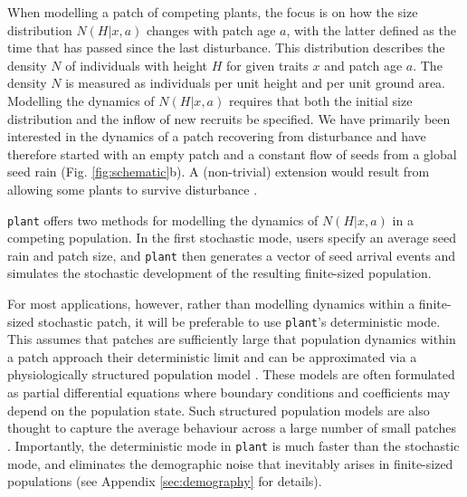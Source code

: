 \documentclass[a4paper,11pt]{article}
\newcommand{\plant}{\texttt{plant}}
\begin{document}
When modelling a patch of competing plants, the focus is on how the size distribution \(N(H | x, a)\) changes with patch age \(a\), with the latter defined as the time that has passed since the last disturbance. This distribution describes the density \(N\) of
individuals with height \(H\) for given traits \(x\) and patch age \(a\).
The density \(N\) is measured as individuals per unit height and per unit ground area.
Modelling the dynamics of \(N(H | x, a)\) requires that both the initial size distribution and the inflow of new recruits be specified. We have primarily
been interested in the dynamics of a patch recovering from disturbance and have
therefore started with an empty patch and a constant flow of seeds from a global
seed rain (Fig. \ref{fig:schematic}b). A (non-trivial) extension would result from allowing some plants to survive disturbance \citep[following][]{Kohyama-1993}.

{\plant} offers two methods for modelling the dynamics of \(N(H | x, a)\)
in a competing population. In the first stochastic mode, users
specify an average seed rain and patch size, and {\plant} then generates a
vector of seed arrival events and simulates the stochastic
development of the resulting finite-sized population.

For most applications, however, rather than modelling
dynamics within a finite-sized stochastic patch, it will be preferable to use {\plant}'s
deterministic mode. This assumes that
patches are sufficiently large that population dynamics within a
patch approach their deterministic limit and can
be approximated via a physiologically structured population model \citep{Metz-1986, Deroos-1997, Kohyama-1993}. These models are often formulated as partial differential equations where boundary conditions and coefficients may depend on the population state. Such structured population models are also thought to
capture the average behaviour across a large number of small patches
\citep{Moorcroft-2001}. Importantly, the deterministic mode in {\plant} is
much faster than the stochastic mode, and eliminates the demographic noise
that inevitably arises in finite-sized populations (see Appendix \ref{sec:demography} for details).
\end{document}
